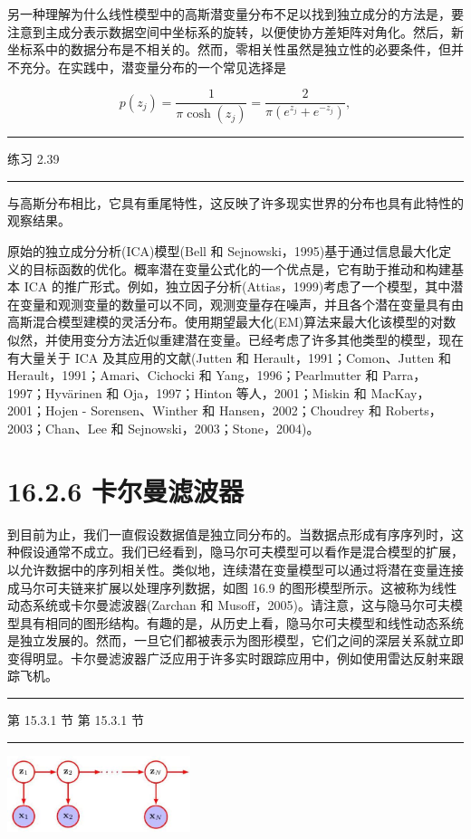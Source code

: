 \documentclass[10pt]{report}
\newcommand{\HRule}{\begin{center}\rule{0.9\linewidth}{0.2mm}\end{center}}
\begin{document}
另一种理解为什么线性模型中的高斯潜变量分布不足以找到独立成分的方法是，要注意到主成分表示数据空间中坐标系的旋转，以便使协方差矩阵对角化。然后，新坐标系中的数据分布是不相关的。然而，零相关性虽然是独立性的必要条件，但并不充分。在实践中，潜变量分布的一个常见选择是

\[
p\left( {z}_{j}\right)  = \frac{1}{\pi \cosh \left( {z}_{j}\right) } = \frac{2}{\pi \left( {{e}^{{z}_{j}} + {e}^{-{z}_{j}}}\right) }, \tag{16.56}
\]

\HRule

练习 2.39

\HRule

与高斯分布相比，它具有重尾特性，这反映了许多现实世界的分布也具有此特性的观察结果。

原始的独立成分分析(ICA)模型(Bell 和 Sejnowski，1995)基于通过信息最大化定义的目标函数的优化。概率潜在变量公式化的一个优点是，它有助于推动和构建基本 ICA 的推广形式。例如，独立因子分析(Attias，1999)考虑了一个模型，其中潜在变量和观测变量的数量可以不同，观测变量存在噪声，并且各个潜在变量具有由高斯混合模型建模的灵活分布。使用期望最大化(EM)算法来最大化该模型的对数似然，并使用变分方法近似重建潜在变量。已经考虑了许多其他类型的模型，现在有大量关于 ICA 及其应用的文献(Jutten 和 Herault，1991；Comon、Jutten 和 Herault，1991；Amari、Cichocki 和 Yang，1996；Pearlmutter 和 Parra，1997；Hyvärinen 和 Oja，1997；Hinton 等人，2001；Miskin 和 MacKay，2001；Hojen - Sorensen、Winther 和 Hansen，2002；Choudrey 和 Roberts，2003；Chan、Lee 和 Sejnowski，2003；Stone，2004)。

\section*{16.2.6 卡尔曼滤波器}

到目前为止，我们一直假设数据值是独立同分布的。当数据点形成有序序列时，这种假设通常不成立。我们已经看到，隐马尔可夫模型可以看作是混合模型的扩展，以允许数据中的序列相关性。类似地，连续潜在变量模型可以通过将潜在变量连接成马尔可夫链来扩展以处理序列数据，如图 16.9 的图形模型所示。这被称为线性动态系统或卡尔曼滤波器(Zarchan 和 Musoff，2005)。请注意，这与隐马尔可夫模型具有相同的图形结构。有趣的是，从历史上看，隐马尔可夫模型和线性动态系统是独立发展的。然而，一旦它们都被表示为图形模型，它们之间的深层关系就立即变得明显。卡尔曼滤波器广泛应用于许多实时跟踪应用中，例如使用雷达反射来跟踪飞机。

\HRule

第 15.3.1 节 第 15.3.1 节

\HRule

\begin{center}
\includegraphics[max width=0.4\textwidth]{images/0194e279-9b28-703a-88f4-c3ac21e2010d_535_1013_343_535_223_0.jpg}
\end{center}
\hspace*{3em} 
\end{document}
